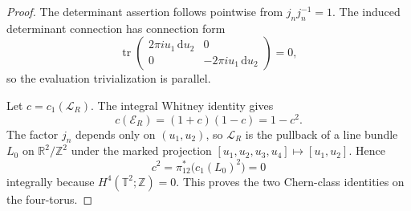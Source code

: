 \begin{proof}
The determinant assertion follows pointwise from
\(j_nj_n^{-1}=1\).  The induced determinant connection has connection
form
\[
 \operatorname{tr}
 \begin{pmatrix}
  2\pi i u_1\,\mathrm du_2&0\\0&-2\pi i u_1\,\mathrm du_2
 \end{pmatrix}=0,
\]
so the evaluation trivialization is parallel.

Let \(c=c_1(\mathscr L_R)\).  The integral Whitney identity gives
\[
 c(\mathscr E_R)=(1+c)(1-c)=1-c^2.
\]
The factor \(j_n\) depends only on \((u_1,u_2)\), so \(\mathscr L_R\) is the
pullback of a line bundle \(L_0\) on
\(\mathbb R^2/\mathbb Z^2\) under the marked projection
\([u_1,u_2,u_3,u_4]\mapsto[u_1,u_2]\).  Hence
\[
 c^2=\pi_{12}^*\bigl(c_1(L_0)^2\bigr)=0
\]
integrally because \(H^4(\mathbb T^2;\mathbb Z)=0\).  This proves the two
Chern-class identities on the four-torus.


\end{proof}
